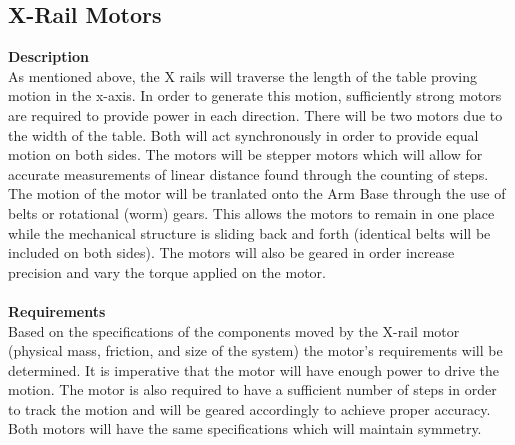 \documentclass[titlepage]{article}
\begin{document}
\begin{center}
\begin{center}
\begin{center}
\begin{center}
\begin{center}
\begin{center}
\begin{center}
\begin{center}
\begin{center}
\begin{center}
\begin{center}
\begin{center}
\begin{center}
\begin{center}
\begin{center}
\begin{center}
\begin{center}
\begin{center}
\begin{center}
\begin{center}
\subsection{X-Rail Motors}
\textbf{Description}\\
As mentioned above, the X rails will traverse the length of the table proving motion in the x-axis. In order to generate this motion, sufficiently strong motors are required to provide power in each direction. There will be two motors due to the width of the table. Both will act synchronously in order to provide equal motion on both sides. The motors will be stepper motors which will allow for accurate measurements of linear distance found through the counting of steps. The motion of the motor will be tranlated onto the Arm Base through the use of belts or rotational (worm) gears. This allows the motors to remain in one place while the mechanical structure is sliding back and forth (identical belts will be included on both sides). The motors will also be geared in order increase precision and vary the torque applied on the motor.\\\\
\textbf{Requirements}\\
Based on the specifications of the components moved by the X-rail motor (physical mass, friction, and size of the system) the motor's requirements will be determined. It is imperative that the motor will have enough power to drive the motion. The motor is also required to have a sufficient number of steps in order to track the motion and will be geared accordingly to achieve proper accuracy. Both motors will have the same specifications which will maintain symmetry. 


\end{center}
\end{center}
\end{center}
\end{center}
\end{center}
\end{center}
\end{center}
\end{center}
\end{center}
\end{center}
\end{center}
\end{center}
\end{center}
\end{center}
\end{center}
\end{center}
\end{center}
\end{center}
\end{center}
\end{center}
\end{document}
